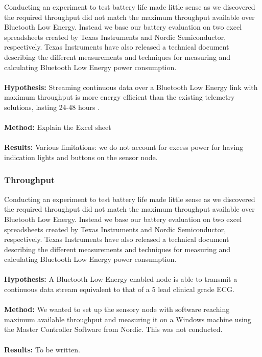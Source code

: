 Conducting an experiment to test battery life made little sense as we discovered the required throughput did not match the maximum throughput available over Bluetooth Low Energy. Instead we base our battery evaluation on two excel spreadsheets created by Texas Instruments and Nordic Semiconductor, respectively. Texas Instruments have also released a technical document \cite{TIbatteryCalculations} describing the different measurements and techniques for measuring and calculating Bluetooth Low Energy power consumption.
\\
\\
\noindent %
\textbf{Hypothesis:} Streaming continuous data over a Bluetooth Low Energy link with maximum throughput is more energy efficient than the existing telemetry solutions, lasting 24-48 hours \cite{philipsIntellivueTrancievers}.
\\
\\
\noindent
\textbf{Method:} Explain the Excel sheet
\\
\\
\noindent
\textbf{Results:} Various limitations: we do not account for excess power for having indication lights and buttons on the sensor node.

\subsubsection{Throughput} %
\label{ssub:throughput}

Conducting an experiment to test battery life made little sense as we discovered the required throughput did not match the maximum throughput available over Bluetooth Low Energy. Instead we base our battery evaluation on two excel spreadsheets created by Texas Instruments and Nordic Semiconductor, respectively. Texas Instruments have also released a technical document \cite{TIbatteryCalculations} describing the different measurements and techniques for measuring and calculating Bluetooth Low Energy power consumption.
\\
\\
\noindent
\textbf{Hypothesis:} A Bluetooth Low Energy enabled node is able to transmit a continuous data stream equivalent to that of a 5 lead clinical grade ECG.
\\
\\
\noindent
\textbf{Method:} We wanted to set up the sensory node with software reaching maximum available throughput and measuring it on a Windows machine using the Master Controller Software from Nordic. This was not conducted.
\\
\\
\noindent
\textbf{Results:} To be written.




